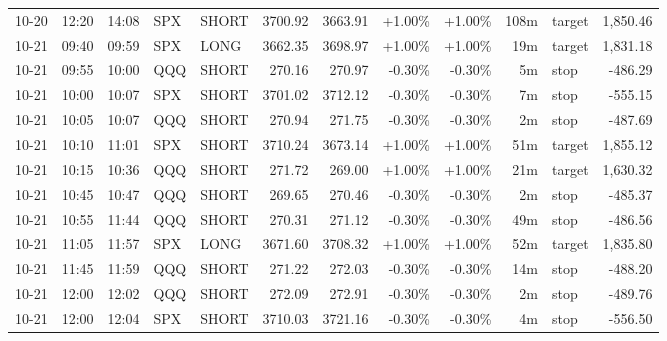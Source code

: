 \documentclass[11pt,a4paper,twoside]{article}
\begin{document}
\begin{center}
\begin{longtable}{>{\color{txtmain}}l l l l l r r r r r >{\color{txtmain}}l r}
10-20 & 12:20 & 14:08 & SPX & SHORT & 3700.92 & 3663.91 & \textcolor{wingreen}{+1.00\%} & \textcolor{wingreen}{+1.00\%} & 108m & target & \textcolor{wingreen}{1,850.46} \\
10-21 & 09:40 & 09:59 & SPX & LONG & 3662.35 & 3698.97 & \textcolor{wingreen}{+1.00\%} & \textcolor{wingreen}{+1.00\%} & 19m & target & \textcolor{wingreen}{1,831.18} \\
10-21 & 09:55 & 10:00 & QQQ & SHORT & 270.16 & 270.97 & \textcolor{lossred}{-0.30\%} & \textcolor{lossred}{-0.30\%} & 5m & stop & \textcolor{lossred}{-486.29} \\
10-21 & 10:00 & 10:07 & SPX & SHORT & 3701.02 & 3712.12 & \textcolor{lossred}{-0.30\%} & \textcolor{lossred}{-0.30\%} & 7m & stop & \textcolor{lossred}{-555.15} \\
10-21 & 10:05 & 10:07 & QQQ & SHORT & 270.94 & 271.75 & \textcolor{lossred}{-0.30\%} & \textcolor{lossred}{-0.30\%} & 2m & stop & \textcolor{lossred}{-487.69} \\
10-21 & 10:10 & 11:01 & SPX & SHORT & 3710.24 & 3673.14 & \textcolor{wingreen}{+1.00\%} & \textcolor{wingreen}{+1.00\%} & 51m & target & \textcolor{wingreen}{1,855.12} \\
10-21 & 10:15 & 10:36 & QQQ & SHORT & 271.72 & 269.00 & \textcolor{wingreen}{+1.00\%} & \textcolor{wingreen}{+1.00\%} & 21m & target & \textcolor{wingreen}{1,630.32} \\
10-21 & 10:45 & 10:47 & QQQ & SHORT & 269.65 & 270.46 & \textcolor{lossred}{-0.30\%} & \textcolor{lossred}{-0.30\%} & 2m & stop & \textcolor{lossred}{-485.37} \\
10-21 & 10:55 & 11:44 & QQQ & SHORT & 270.31 & 271.12 & \textcolor{lossred}{-0.30\%} & \textcolor{lossred}{-0.30\%} & 49m & stop & \textcolor{lossred}{-486.56} \\
10-21 & 11:05 & 11:57 & SPX & LONG & 3671.60 & 3708.32 & \textcolor{wingreen}{+1.00\%} & \textcolor{wingreen}{+1.00\%} & 52m & target & \textcolor{wingreen}{1,835.80} \\
10-21 & 11:45 & 11:59 & QQQ & SHORT & 271.22 & 272.03 & \textcolor{lossred}{-0.30\%} & \textcolor{lossred}{-0.30\%} & 14m & stop & \textcolor{lossred}{-488.20} \\
10-21 & 12:00 & 12:02 & QQQ & SHORT & 272.09 & 272.91 & \textcolor{lossred}{-0.30\%} & \textcolor{lossred}{-0.30\%} & 2m & stop & \textcolor{lossred}{-489.76} \\
10-21 & 12:00 & 12:04 & SPX & SHORT & 3710.03 & 3721.16 & \textcolor{lossred}{-0.30\%} & \textcolor{lossred}{-0.30\%} & 4m & stop & \textcolor{lossred}{-556.50} \\

\end{longtable}
\end{center}
\end{document}
